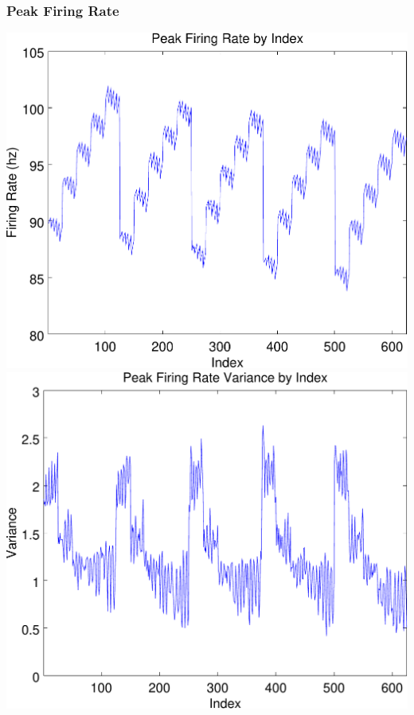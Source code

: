 \documentclass{beamer}
\theoremstyle{plain}
\theoremstyle{definition}
\begin{document}
\begin{frame}\frametitle{Peak Firing Rate}
  \begin{center}
    \includegraphics[scale=.32]{PeakFiringRate.pdf}%
    \includegraphics[scale=.32]{PeakFiringRateVariance.pdf}
  \end{center}
\end{frame}
\end{document}
